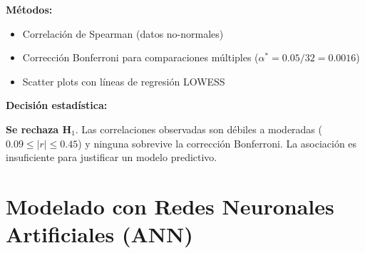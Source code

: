 \documentclass[12pt,letterpaper,twoside]{report}
\begin{document}
\begin{estadisticobox}
\textbf{Métodos:}

\begin{itemize}[noitemsep]
    \item Correlación de Spearman (datos no-normales)
    \item Corrección Bonferroni para comparaciones múltiples ($\alpha^* = 0.05 / 32 = 0.0016$)
    \item Scatter plots con líneas de regresión LOWESS
\end{itemize}
\end{estadisticobox}

\begin{table}[H]
\centering
\caption{Matriz de Correlación: Biométricos Agregados vs SF-36 ($N=10$)}
\label{tab:correlation_sf36}
\end{table}

\begin{decisionbox}
\textbf{Decisión estadística:}

\textbf{Se rechaza H$_1$}. Las correlaciones observadas son débiles a moderadas ($0.09 \leq |r| \leq 0.45$) y ninguna sobrevive la corrección Bonferroni. La asociación es insuficiente para justificar un modelo predictivo.
\end{decisionbox}

\section{Modelado con Redes Neuronales Artificiales (ANN)}
\end{document}
